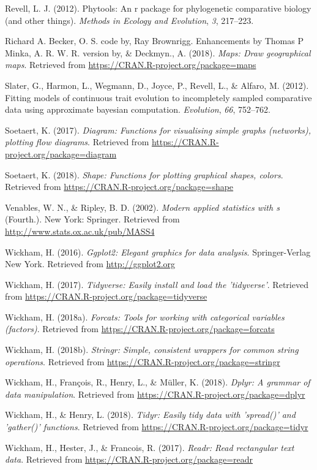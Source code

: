 \documentclass[man,floatsintext]{apa6}
\theoremstyle{definition}
\theoremstyle{definition}
\theoremstyle{definition}
\theoremstyle{remark}
\begin{document}
\leavevmode\hypertarget{ref-R-phytools}{}%
Revell, L. J. (2012). Phytools: An r package for phylogenetic
comparative biology (and other things). \emph{Methods in Ecology and
Evolution}, \emph{3}, 217--223.

\leavevmode\hypertarget{ref-R-maps}{}%
Richard A. Becker, O. S. code by, Ray Brownrigg. Enhancements by Thomas
P Minka, A. R. W. R. version by, \& Deckmyn., A. (2018). \emph{Maps:
Draw geographical maps}. Retrieved from
\url{https://CRAN.R-project.org/package=maps}

\leavevmode\hypertarget{ref-R-geiger_c}{}%
Slater, G., Harmon, L., Wegmann, D., Joyce, P., Revell, L., \& Alfaro,
M. (2012). Fitting models of continuous trait evolution to incompletely
sampled comparative data using approximate bayesian computation.
\emph{Evolution}, \emph{66}, 752--762.

\leavevmode\hypertarget{ref-R-diagram}{}%
Soetaert, K. (2017). \emph{Diagram: Functions for visualising simple
graphs (networks), plotting flow diagrams}. Retrieved from
\url{https://CRAN.R-project.org/package=diagram}

\leavevmode\hypertarget{ref-R-shape}{}%
Soetaert, K. (2018). \emph{Shape: Functions for plotting graphical
shapes, colors}. Retrieved from
\url{https://CRAN.R-project.org/package=shape}

\leavevmode\hypertarget{ref-R-MASS}{}%
Venables, W. N., \& Ripley, B. D. (2002). \emph{Modern applied
statistics with s} (Fourth.). New York: Springer. Retrieved from
\url{http://www.stats.ox.ac.uk/pub/MASS4}

\leavevmode\hypertarget{ref-R-ggplot2}{}%
Wickham, H. (2016). \emph{Ggplot2: Elegant graphics for data analysis}.
Springer-Verlag New York. Retrieved from \url{http://ggplot2.org}

\leavevmode\hypertarget{ref-R-tidyverse}{}%
Wickham, H. (2017). \emph{Tidyverse: Easily install and load the
'tidyverse'}. Retrieved from
\url{https://CRAN.R-project.org/package=tidyverse}

\leavevmode\hypertarget{ref-R-forcats}{}%
Wickham, H. (2018a). \emph{Forcats: Tools for working with categorical
variables (factors)}. Retrieved from
\url{https://CRAN.R-project.org/package=forcats}

\leavevmode\hypertarget{ref-R-stringr}{}%
Wickham, H. (2018b). \emph{Stringr: Simple, consistent wrappers for
common string operations}. Retrieved from
\url{https://CRAN.R-project.org/package=stringr}

\leavevmode\hypertarget{ref-R-dplyr}{}%
Wickham, H., François, R., Henry, L., \& Müller, K. (2018). \emph{Dplyr:
A grammar of data manipulation}. Retrieved from
\url{https://CRAN.R-project.org/package=dplyr}

\leavevmode\hypertarget{ref-R-tidyr}{}%
Wickham, H., \& Henry, L. (2018). \emph{Tidyr: Easily tidy data with
'spread()' and 'gather()' functions}. Retrieved from
\url{https://CRAN.R-project.org/package=tidyr}

\leavevmode\hypertarget{ref-R-readr}{}%
Wickham, H., Hester, J., \& Francois, R. (2017). \emph{Readr: Read
rectangular text data}. Retrieved from
\url{https://CRAN.R-project.org/package=readr}

\endgroup
\end{document}
